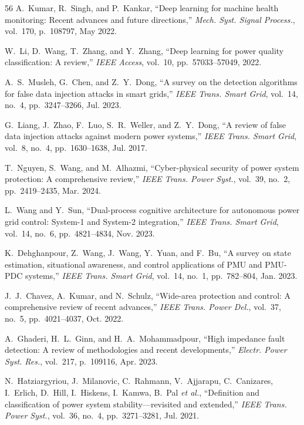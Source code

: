 \documentclass[journal]{IEEEtran}
\begin{document}
\begin{thebibliography}{56}
 A.~Kumar, R.~Singh, and P.~Kankar, ``Deep learning for machine health monitoring: Recent advances and future directions,'' \textit{Mech. Syst. Signal Process.}, vol.~170, p.~108797, May 2022.

 W.~Li, D.~Wang, T.~Zhang, and Y.~Zhang, ``Deep learning for power quality classification: A review,'' \textit{IEEE Access}, vol.~10, pp.~57033--57049, 2022.

 A.~S.~Musleh, G.~Chen, and Z.~Y.~Dong, ``A survey on the detection algorithms for false data injection attacks in smart grids,'' \textit{IEEE Trans. Smart Grid}, vol.~14, no.~4, pp.~3247--3266, Jul. 2023.

 G.~Liang, J.~Zhao, F.~Luo, S.~R.~Weller, and Z.~Y.~Dong, ``A review of false data injection attacks against modern power systems,'' \textit{IEEE Trans. Smart Grid}, vol.~8, no.~4, pp.~1630--1638, Jul. 2017.

 T.~Nguyen, S.~Wang, and M.~Alhazmi, ``Cyber-physical security of power system protection: A comprehensive review,'' \textit{IEEE Trans. Power Syst.}, vol.~39, no.~2, pp.~2419--2435, Mar. 2024.

 L.~Wang and Y.~Sun, ``Dual-process cognitive architecture for autonomous power grid control: System-1 and System-2 integration,'' \textit{IEEE Trans. Smart Grid}, vol.~14, no.~6, pp.~4821--4834, Nov. 2023.

 K.~Dehghanpour, Z.~Wang, J.~Wang, Y.~Yuan, and F.~Bu, ``A survey on state estimation, situational awareness, and control applications of PMU and PMU-PDC systems,'' \textit{IEEE Trans. Smart Grid}, vol.~14, no.~1, pp.~782--804, Jan. 2023.

 J.~J.~Chavez, A.~Kumar, and N.~Schulz, ``Wide-area protection and control: A comprehensive review of recent advances,'' \textit{IEEE Trans. Power Del.}, vol.~37, no.~5, pp.~4021--4037, Oct. 2022.

 A.~Ghaderi, H.~L.~Ginn, and H.~A.~Mohammadpour, ``High impedance fault detection: A review of methodologies and recent developments,'' \textit{Electr. Power Syst. Res.}, vol.~217, p.~109116, Apr. 2023.

 N.~Hatziargyriou, J.~Milanovic, C.~Rahmann, V.~Ajjarapu, C.~Canizares, I.~Erlich, D.~Hill, I.~Hiskens, I.~Kamwa, B.~Pal \emph{et al.}, ``Definition and classification of power system stability---revisited and extended,'' \textit{IEEE Trans. Power Syst.}, vol.~36, no.~4, pp.~3271--3281, Jul. 2021.


\end{thebibliography}
\end{document}
